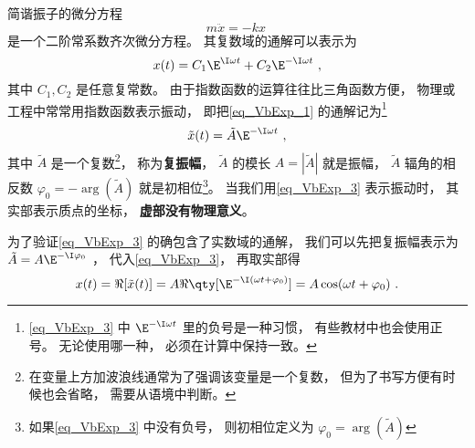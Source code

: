 

简谐振子的微分方程
\begin{equation}\label{eq_VbExp_1}
m\ddot x =  - kx~
\end{equation}
是一个二阶常系数齐次微分方程。 其复数域的通解可以表示为
\begin{equation}
x(t) = C_1 \E^{\I \omega t} + C_2 \E^{-\I \omega t}~,
\end{equation}
其中 $C_1, C_2$ 是任意复常数。 由于指数函数的运算往往比三角函数方便， 物理或工程中常常用指数函数表示振动， 即把\autoref{eq_VbExp_1} 的通解记为\footnote{\autoref{eq_VbExp_3} 中 $\E^{-\I \omega t}$ 里的负号是一种习惯， 有些教材中也会使用正号。 无论使用哪一种， 必须在计算中保持一致。}
\begin{equation}\label{eq_VbExp_3}
\tilde x(t) = \tilde A \E^{-\I \omega t}~,
\end{equation}
其中 $\tilde A$ 是一个复数\footnote{在变量上方加波浪线通常为了强调该变量是一个复数， 但为了书写方便有时候也会省略， 需要从语境中判断。}， 称为\textbf{复振幅}， $\tilde A$ 的模长 $A = |\tilde A|$ 就是振幅， $\tilde A$ 辐角的相反数 $\varphi_0 = -\arg(\tilde A)$ 就是初相位\footnote{如果\autoref{eq_VbExp_3} 中没有负号， 则初相位定义为 $\varphi_0 = \arg(\tilde A)$}。 当我们用\autoref{eq_VbExp_3} 表示振动时， 其实部表示质点的坐标， \textbf{虚部没有物理意义}。

为了验证\autoref{eq_VbExp_3} 的确包含了实数域的通解， 我们可以先把复振幅表示为 $\tilde A = A\E^{-\I \varphi_0}$%
， 代入\autoref{eq_VbExp_3}， 再取实部得
\begin{equation}\label{eq_VbExp_2}
x(t) = \Re[\tilde x(t)] = A\Re \qty[\E^{-\I (\omega t + \varphi_0)}] = A \cos(\omega t + \varphi_0)~.
\end{equation}

